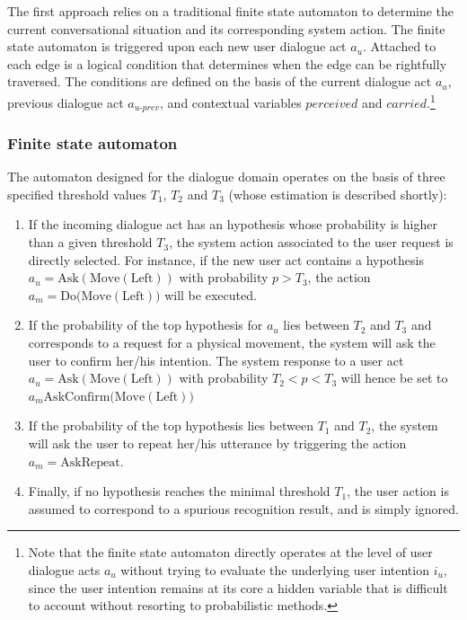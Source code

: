 The first approach relies on a traditional finite state automaton to determine the current conversational situation and its corresponding system action.  The finite state automaton is triggered upon each new user dialogue act $a_u$. Attached to each edge is a logical condition that determines when the edge can be rightfully traversed. The conditions are defined on the basis of the current dialogue act $a_u$, previous dialogue act $a_{u\mbox{-}prev}$, and contextual variables $\mathit{perceived}$ and $\mathit{carried}$.\footnote{Note that the finite state automaton directly operates at the level of user dialogue acts $a_u$ without trying to evaluate the underlying user intention $i_u$, since the user intention remains at its core a hidden variable that is difficult to account without resorting to probabilistic methods.}

\subsubsection*{Finite state automaton}

The automaton designed for the dialogue domain operates on the basis of three specified threshold values $T_1$, $T_2$ and $T_3$ (whose estimation is described shortly):
\begin{enumerate}
\item If the incoming dialogue act has an hypothesis whose probability is higher than a given threshold $T_3$, the system action associated to the user request is directly selected.  For instance, if the new user act contains a hypothesis $a_u = \mathrm{Ask(Move(Left))}$ with probability $p > T_3$, the action $a_m = \mathrm{Do(Move(Left)})$ will be executed.
\item If the probability of the top hypothesis for $a_u$ lies between $T_2$ and $T_3$ and corresponds to a request for a physical movement, the system will ask the user to confirm her/his intention.  The system response to a user act $a_u = \mathrm{Ask(Move(Left))}$ with probability $T_2 < p < T_3$ will hence be set to $a_m \mathrm{AskConfirm(Move(Left)})$
\item If the probability of the top hypothesis lies between $T_1$ and $T_2$, the system will ask the user to repeat her/his utterance by triggering the action $a_m = \mathrm{AskRepeat}$. 
\item Finally, if no hypothesis reaches the minimal threshold $T_1$, the user action is assumed to correspond to a spurious recognition result, and is simply ignored.
\end{enumerate}

